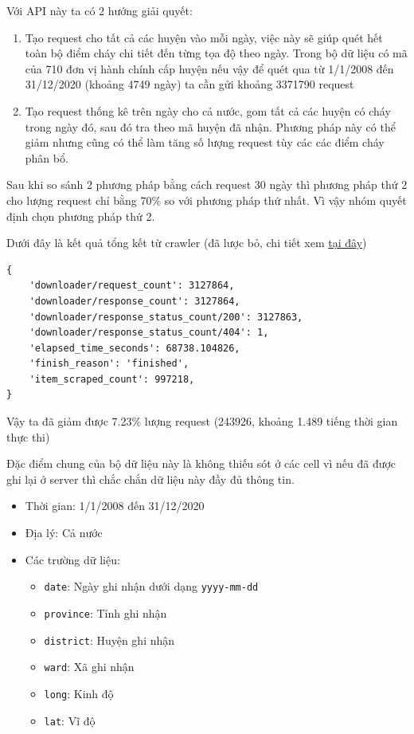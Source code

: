 \documentclass{article}
\begin{document}
Với API này ta có 2 hướng giải quyết:
\begin{enumerate}
	\item Tạo request cho tất cả các huyện vào mỗi ngày, việc này sẽ giúp quét hết toàn bộ điểm cháy chi tiết đến từng tọa độ theo ngày. Trong bộ dữ liệu có mã của 710 đơn vị hành chính cấp huyện nếu vậy để quét qua từ 1/1/2008 đến 31/12/2020 (khoảng 4749 ngày) ta cần gửi khoảng 3371790 request
	\item Tạo request thống kê trên ngày cho cả nước, gom tất cả các huyện có cháy trong ngày đó, sau đó tra theo mã huyện đã nhận. Phương pháp này có thể giảm nhưng cũng có thể làm tăng số lượng request tùy các các điểm cháy phân bổ.
\end{enumerate}

Sau khi so sánh 2 phương pháp bằng cách request 30 ngày thì phương pháp thứ 2 cho lượng request chỉ bằng 70\% so với phương pháp thứ nhất. Vì vậy nhóm quyết định chọn phương pháp thứ 2.

Dưới đây là kết quả tổng kết từ crawler (đã lược bỏ, chi tiết xem \href{https://github.com/vanviethieuanh/CS114.L21/blob/920ee0722baa05582e67e05f8e5a2a350b18b956/DoAn/Wildfire/wildfire/scrape-log.txt}{tại đây})

\begin{verbatim}
{
    'downloader/request_count': 3127864,
    'downloader/response_count': 3127864,
    'downloader/response_status_count/200': 3127863,
    'downloader/response_status_count/404': 1,
    'elapsed_time_seconds': 68738.104826,
    'finish_reason': 'finished',
    'item_scraped_count': 997218,
}
\end{verbatim}

Vậy ta đã giảm được 7.23\% lượng request (243926, khoảng 1.489 tiếng thời gian thực thi)

Đặc điểm chung của bộ dữ liệu này là không thiếu sót ở các cell vì nếu đã được ghi lại ở server thì chắc chắn dữ liệu này đầy đủ thông tin.

\begin{itemize}
	\item Thời gian: 1/1/2008 đến 31/12/2020
	\item Địa lý: Cả nước
	\item { Các trường dữ liệu:
	      \begin{itemize}
		      \item \texttt{date}: Ngày ghi nhận dưới dạng \texttt{yyyy-mm-dd}
		      \item \texttt{province}: Tỉnh ghi nhận
		      \item \texttt{district}: Huyện ghi nhận
		      \item \texttt{ward}: Xã ghi nhận
		      \item \texttt{long}: Kinh độ
		      \item \texttt{lat}: Vĩ độ
	      \end{itemize}
	      }
\end{itemize}
\end{document}
